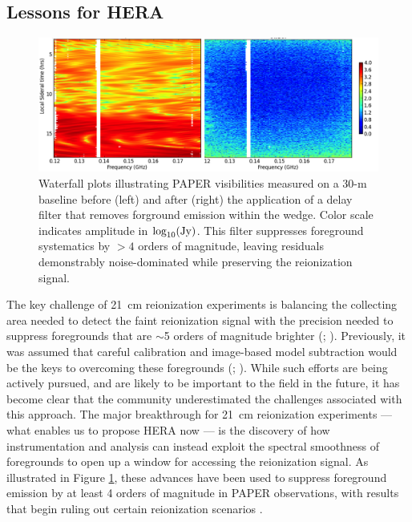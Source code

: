 \documentclass[preprint]{aastex}
\newcommand{\Mycitep}[1]{{\bf \citep{#1}}}
\newcommand{\Mycitealt}[1]{{\bf \citealt{#1}}}
\newcommand{\compress}{\vspace{-0.25in}}
\newcommand{\Caption}[4]{\vspace{#1}\renewcommand{\baselinestretch}{#2}\caption{#4}\vspace{#3}}
\begin{document}
\compress
\subsection{Lessons for HERA}
\label{sec:Lessons}

\begin{figure}[t]\centering
\includegraphics[width=6in]{plots/waterfall_filtered.png}
\Caption{-0.15in}{0.99}{-0.15in}{\small 
Waterfall plots illustrating PAPER visibilities
measured on a 30-m baseline before (left) and after (right) the application of a 
delay filter that removes forground emission within the wedge.  Color scale indicates amplitude in $\log_{10}({\rm Jy})$.
This filter suppresses
foreground systematics by $>4$ orders of magnitude, leaving residuals demonstrably noise-dominated while preserving the reionization signal.
}\label{fig:waterfall} \end{figure}


The key challenge of 21~cm reionization experiments is 
balancing the collecting area needed to detect the faint reionization signal
with the precision needed to suppress
foregrounds that are $\sim$5 orders of magnitude brighter (\Mycitealt{deoliveira2008}; \citealt{jelic_et_al2008}).
Previously, it was assumed that careful calibration and image-based model subtraction would be the keys to overcoming these foregrounds
(\Mycitealt{liu_et_al2008,juddEarly}; \citealt{harker_et_al2009}).
While such efforts are being actively pursued, and are likely to be important to the field in the future,
it has become clear that the community underestimated the challenges associated with this approach.
The major breakthrough for 21~cm reionization experiments --- what enables us to propose HERA now --- is 
the discovery of how 
instrumentation and analysis can instead exploit the 
spectral smoothness of foregrounds 
to open up a window for accessing the reionization signal. 
As illustrated in Figure \ref{fig:waterfall}, these advances have been used to suppress foreground emission by at least 4
orders of magnitude in PAPER observations,
with results that begin ruling out certain reionization scenarios
\Mycitep{parsons_et_al2013}.
\end{document}
